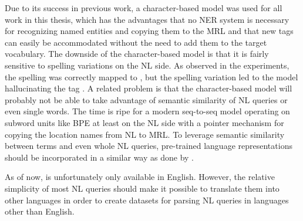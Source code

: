 Due to its success in previous work, a character-based model was used for all
work in this thesis, which has the advantages that no NER system is necessary
for recognizing named entities and copying them to the MRL and that new tags can
easily be accommodated without the need to add them to the target vocabulary.
The downside of the character-based model is that it is fairly sensitive to
spelling variations on the NL side. As observed in the experiments, the spelling
 was correctly mapped to , but the
spelling variation  led to the model hallucinating the tag
. A related problem is that the character-based
model will probably not be able to take advantage of semantic similarity of NL
queries or even single words. The time is ripe for a modern seq-to-seq model
operating on subword units like BPE at least on the NL side with a pointer
mechanism \parencite{see-2017} for copying the location names from NL to MRL. To
leverage semantic similarity between terms and even whole NL queries,
pre-trained language representations should be incorporated in a similar way as
done by \textcite{chen-2020}.

As of now, \nlmaps{} is unfortunately only available in English. However, the
relative simplicity of most NL queries should make it possible to translate them
into other languages in order to create datasets for parsing NL queries in
languages other than English.

